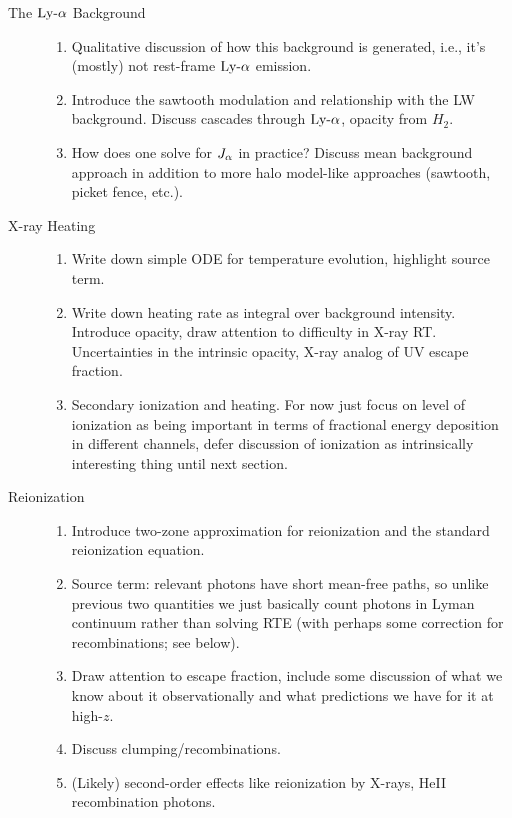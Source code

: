 \documentclass[letterpaper,titlepage,12pt]{article}
\begin{document}
\begin{description}
  \item[The $\text{Ly-}\alpha$ Background] \hfill
  \begin{enumerate}
      \item Qualitative discussion of how this background is generated, i.e., it's (mostly) not rest-frame $\text{Ly-}\alpha$ emission.
      \item Introduce the sawtooth modulation and relationship with the LW background. Discuss cascades through $\text{Ly-}\alpha$, opacity from $H_2$.
      \item How does one solve for $J_{\alpha}$ in practice? Discuss mean background approach in addition to more halo model-like approaches (sawtooth, picket fence, etc.).
  \end{enumerate}

  \item[X-ray Heating] \hfill
  \begin{enumerate}
      \item Write down simple ODE for temperature evolution, highlight source term.
      \item Write down heating rate as integral over background intensity. Introduce opacity, draw attention to difficulty in X-ray RT. Uncertainties in the intrinsic opacity, X-ray analog of UV escape fraction.
      \item Secondary ionization and heating. For now just focus on level of ionization as being important in terms of fractional energy deposition in different channels, defer discussion of ionization as intrinsically interesting thing until next section.
  \end{enumerate}

  \item[Reionization] \hfill
  \begin{enumerate}
      \item Introduce two-zone approximation for reionization and the standard reionization equation.
      \item Source term: relevant photons have short mean-free paths, so unlike previous two quantities we just basically count photons in Lyman continuum rather than solving RTE (with perhaps some correction for recombinations; see below). 
      \item Draw attention to escape fraction, include some discussion of what we know about it observationally and what predictions we have for it at high-$z$.
      \item Discuss clumping/recombinations.
      \item (Likely) second-order effects like reionization by X-rays, HeII recombination photons.
  \end{enumerate}
\end{description}
\end{document}
